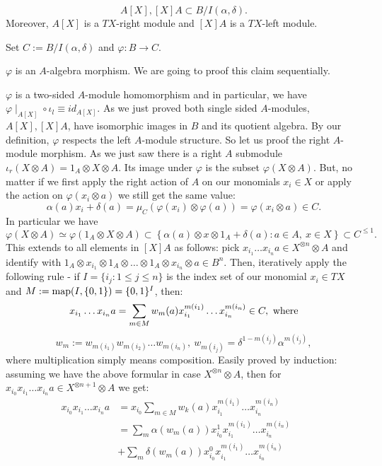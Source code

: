 $$A[X], [X]A \subset B/I(\alpha,\delta).$$
Moreover, $A[X]$ is a $T X$-right module and $[X]A$ is a $T X$-left module.
\item Set $C := B/I(\alpha,\delta)$ and $\varphi : B \longrightarrow C$.
\bd
\item[Claim:] $\varphi$ is an $A$-algebra morphism. We are going to proof this claim sequentially.
\bn
\item $\varphi$ is a two-sided $A$-module homomorphism and in particular, we have $\varphi\mid_{A[X]} \circ \iota_l \equiv id_{A[X]}$. As we just proved both single sided $A$-modules, $A[X], [X]A$, have isomorphic images in $B$ and its quotient algebra. By our definition, $\varphi$ respects the left $A$-module structure. So let us proof the right $A$-module morphism. As we just saw there is a right $A$ submodule $\iota_r(X \otimes A) = 1_A \otimes X \otimes A$. Its image under $\varphi$ is the subset $\varphi(X \otimes A)$. But, no matter if we first apply the right action of $A$ on our monomials $x_i \in X$ or apply the action on $\varphi(x_i \otimes a)$ we still get the same value:
$$\alpha(a) x_i + \delta(a) = \mu_C(\varphi(x_i) \otimes \varphi(a)) = \varphi(x_i \otimes a) \in C.$$
In particular we have
$$\varphi(X \otimes A) \simeq \varphi(1_A \otimes X \otimes A) \subset \left\{\alpha(a) \otimes x \otimes 1_A + \delta(a) : a \in A,\ x \in X\right\} \subset C^{\leq 1}.$$
This extends to all elements in $[X]A$ as follows: pick $x_{i_1} \ldots x_{i_n} a \in X^{\otimes n} \otimes A$ and identify with $1_A \otimes x_{i_1} \otimes 1_A \otimes \ldots \otimes 1_A \otimes x_{i_n} \otimes a \in B^n$. Then, iteratively apply the following rule - if $I = \{i_j : 1 \leq j \leq n\}$ is the index set of our monomial $x_i \in T X$ and $M := \mathrm{map}(I,\{0,1\}) = \{0,1\}^I$, then:
$$x_{i_1} \ldots x_{i_n} a = \sum_{\substack{m \in M}} w_{m}(a) x_{i_1}^{m(i_1)} \ldots x_{i_n}^{m(i_n)} \in C,\ \mathrm{where}$$
$$w_{m} := w_{m(i_1)} w_{m(i_2)} \ldots w_{m(i_n)},\ w_{m(i_j)} = \delta^{1-m(i_j)} \alpha^{m(i_j)},$$
where multiplication simply means composition. 
Easily proved by induction: assuming we have the above formular in case $X^{\otimes n} \otimes A$, then for $x_{i_0} x_{i_1} \ldots x_{i_n} a \in X^{\otimes n + 1} \otimes A$ we get:
\begin{align*}
x_{i_0} x_{i_1} \ldots x_{i_n} a &= x_{i_0} \sum_{m \in M} w_k (a) x_{i_1}^{m(i_1)} \ldots x_{i_n}^{m(i_n)}\\
 &= \sum_m \alpha( w_m(a) ) x_{i_0}^1 x_{i_1}^{m(i_1)} \ldots x_{i_n}^{m(i_n)}\\ & + \sum_m \delta(w_m(a)) x_{i_0}^0 x_{i_1}^{m(i_1)} \ldots x_{i_n}^{m(i_n)}&&\\
\end{align*}
